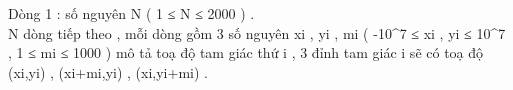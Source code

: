 Dòng 1 : số nguyên N ( 1 ≤ N ≤ 2000 ) .   
\\   N dòng tiếp theo , mỗi dòng gồm 3 số nguyên xi , yi , mi (  -10^7 ≤ xi , yi ≤ 10^7 , 1 ≤ mi  ≤ 1000 ) mô tả toạ độ tam giác thứ i , 3 đỉnh tam giác i sẽ có toạ độ (xi,yi) , (xi+mi,yi) , (xi,yi+mi) .